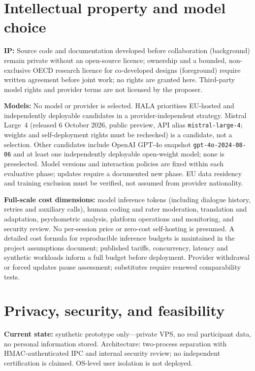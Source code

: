 \documentclass[10pt]{article}
\begin{document}
\section{Intellectual property and model choice}

\noindent\textbf{IP:} Source code and documentation developed before
collaboration (background) remain private without an open-source licence;
ownership and a bounded, non-exclusive OECD research licence for co-developed
designs (foreground) require written agreement before joint work; no rights are granted here.  Third-party model rights and provider terms are
not licensed by the proposer.

\smallskip\noindent\textbf{Models:} No model or provider is selected.  HALA
prioritises EU-hosted and independently deployable candidates in a
provider-independent strategy.  Mistral Large~4 (released 6 October 2026,
public preview, API alias \texttt{mistral-large-4}; weights and self-deployment rights
must be rechecked) is a candidate, not a selection.  Other candidates include OpenAI
GPT-4o snapshot \texttt{gpt-4o-2024-08-06} and at least one independently
deployable open-weight model; none is preselected.  Model versions and
interaction policies are fixed within each evaluative phase; updates require a
documented new phase.  EU data residency and training exclusion must be verified, not assumed from provider nationality.

\smallskip\noindent\textbf{Full-scale cost dimensions:} model inference tokens
(including dialogue history, retries and auxiliary calls), human coding and
rater moderation, translation and adaptation, psychometric analysis, platform
operations and monitoring, and security review.  No per-session price or
zero-cost self-hosting is presumed.  A detailed cost formula for reproducible
inference budgets is maintained in the project assumptions document; published
tariffs, concurrency, latency and synthetic workloads inform a full budget before deployment.
Provider withdrawal or forced updates pause assessment; substitutes require renewed comparability tests.

\section{Privacy, security, and feasibility}

\noindent\textbf{Current state:} synthetic prototype only---private VPS, no
real participant data, no personal information stored.  Architecture:
two-process separation with HMAC-authenticated IPC and internal security review;
no independent certification is claimed.  OS-level user isolation is not
deployed.
\end{document}
